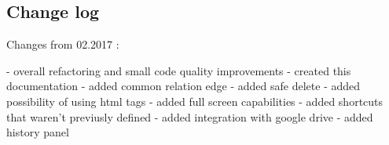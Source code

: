 \documentclass{article}
\begin{document}
\subsection{Change log}

Changes from 02.2017 :

- overall refactoring and small code quality improvements
- created this documentation
- added common relation edge
- added safe delete
- added possibility of using html tags
- added full screen capabilities
- added shortcuts that waren't previusly defined
- added integration with google drive
- added history panel
\end{document}
